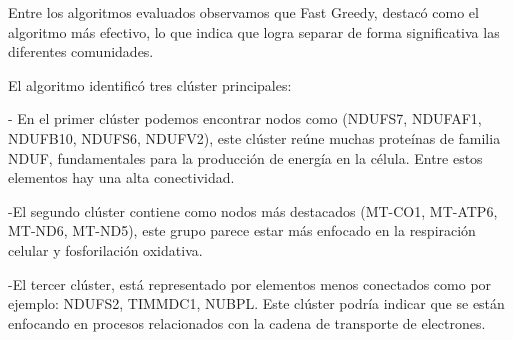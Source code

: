 \vspace{1em}
	

Entre los algoritmos evaluados observamos que Fast Greedy, destacó como el algoritmo más efectivo, lo que indica que logra separar de forma significativa las diferentes comunidades.

El algoritmo identificó tres clúster principales:

- En el primer clúster podemos encontrar nodos como (NDUFS7, NDUFAF1, NDUFB10, NDUFS6, NDUFV2), este clúster reúne muchas proteínas de familia NDUF, fundamentales para la producción de energía en la célula. Entre estos elementos hay una alta conectividad.

-El segundo clúster contiene como nodos más destacados (MT-CO1, MT-ATP6, MT-ND6, MT-ND5), este grupo parece estar más enfocado en la respiración celular y fosforilación oxidativa.

-El tercer clúster, está representado por elementos menos conectados como por ejemplo: NDUFS2, TIMMDC1, NUBPL. Este clúster podría indicar que se están enfocando en procesos relacionados con la cadena de transporte de electrones.
